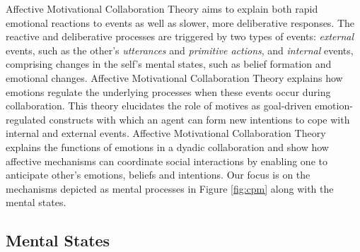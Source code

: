 \documentclass[letterpaper]{article}
\begin{document}
Affective Motivational Collaboration Theory aims to explain both rapid emotional
reactions to events as well as slower, more deliberative responses. The reactive
and deliberative processes are triggered by two types of events:
\textit{external} events, such as the other's \textit{utterances} and
\textit{primitive actions}, and \textit{internal} events, comprising changes in
the self's mental states, such as belief formation and emotional changes.
Affective Motivational Collaboration Theory explains how emotions regulate the
underlying processes when these events occur during collaboration. This theory
elucidates the role of motives as goal-driven emotion-regulated constructs with
which an agent can form new intentions to cope with internal and external
events. Affective Motivational Collaboration Theory explains the functions of
emotions in a dyadic collaboration and show how affective mechanisms can
coordinate social interactions by enabling one to anticipate other's emotions,
beliefs and intentions. Our focus is on the mechanisms depicted as mental
processes in Figure \ref{fig:cpm} along with the mental states. 

\vspace*{-2mm}
\subsection{Mental States}
\end{document}

